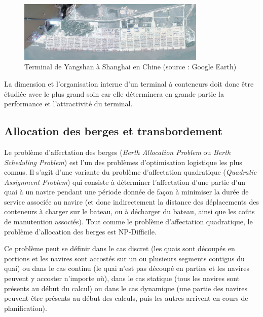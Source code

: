 \begin{figure}[ht]
  \begin{center}
    \includegraphics[width=0.8\textwidth]{chapitres/application/terminalDeYangshan.jpg}
    \caption{Terminal de Yangshan à Shanghai en Chine (source : Google Earth)}
    \label{fig:optTerminaux:shanghaiCT}
  \end{center}
\end{figure}

La dimension et l'organisation interne d'un terminal à conteneurs doit donc être étudiée avec le plus grand soin car elle déterminera en grande partie la performance et l'attractivité du terminal.

\subsection{Allocation des berges et transbordement}

Le problème d'affectation des berges (\textit{Berth Allocation Problem} ou \textit{Berth Scheduling Problem}) est l'un des problèmes d'optimisation logistique les plus connus. Il s'agit d'une variante du problème d'affectation quadratique (\textit{Quadratic Assignment Problem}) qui consiste à déterminer l'affectation d'une partie d'un quai à un navire pendant une période donnée de façon à minimiser la durée de service associée au navire (et donc indirectement la distance des déplacements des conteneurs à charger sur le bateau, ou à décharger du bateau, ainsi que les coûts de manutention associés). Tout comme le problème d'affectation quadratique, le problème d'allocation des berges est NP-Difficile.

Ce problème peut se définir dans le cas discret (les quais sont découpés en portions et les navires sont accostés sur un ou plusieurs segments contigus du quai) ou dans le cas continu (le quai n'est pas découpé en parties et les navires peuvent y accoster n'importe où), dans le cas statique (tous les navires sont présents au début du calcul) ou dans le cas dynamique (une partie des navires peuvent être présents au début des calculs, puis les autres arrivent en cours de planification).

